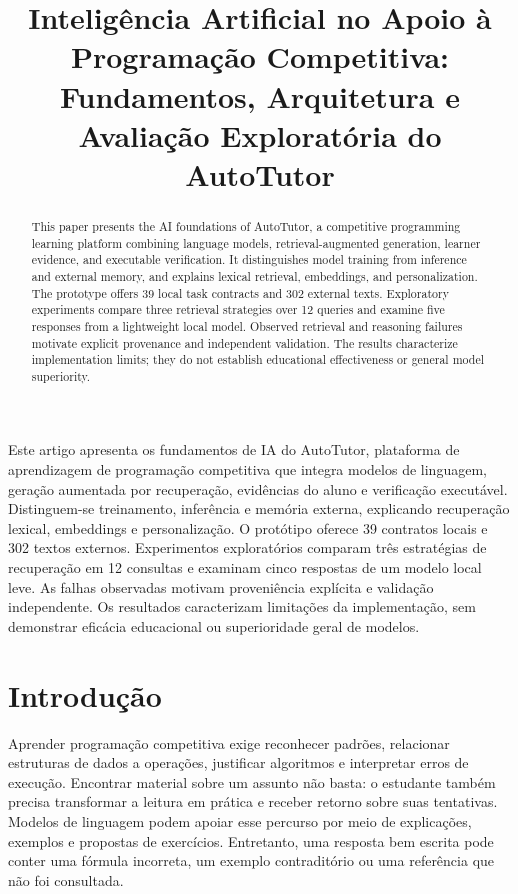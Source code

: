 \documentclass[12pt]{article}
\title{Inteligência Artificial no Apoio à Programação Competitiva:\\Fundamentos, Arquitetura e Avaliação Exploratória do AutoTutor}
\author{\AutoresArtigo}
\begin{document}
\maketitle
\begin{abstract}
This paper presents the AI foundations of AutoTutor, a competitive programming learning platform combining language models, retrieval-augmented generation, learner evidence, and executable verification. It distinguishes model training from inference and external memory, and explains lexical retrieval, embeddings, and personalization. The prototype offers 39 local task contracts and 302 external texts. Exploratory experiments compare three retrieval strategies over 12 queries and examine five responses from a lightweight local model. Observed retrieval and reasoning failures motivate explicit provenance and independent validation. The results characterize implementation limits; they do not establish educational effectiveness or general model superiority.
\end{abstract}
\begin{resumo}
Este artigo apresenta os fundamentos de IA do AutoTutor, plataforma de aprendizagem de programação competitiva que integra modelos de linguagem, geração aumentada por recuperação, evidências do aluno e verificação executável. Distinguem-se treinamento, inferência e memória externa, explicando recuperação lexical, embeddings e personalização. O protótipo oferece 39 contratos locais e 302 textos externos. Experimentos exploratórios comparam três estratégias de recuperação em 12 consultas e examinam cinco respostas de um modelo local leve. As falhas observadas motivam proveniência explícita e validação independente. Os resultados caracterizam limitações da implementação, sem demonstrar eficácia educacional ou superioridade geral de modelos.
\end{resumo}

\section{Introdução}
Aprender programação competitiva exige reconhecer padrões, relacionar estruturas de dados a operações, justificar algoritmos e interpretar erros de execução. Encontrar material sobre um assunto não basta: o estudante também precisa transformar a leitura em prática e receber retorno sobre suas tentativas. Modelos de linguagem podem apoiar esse percurso por meio de explicações, exemplos e propostas de exercícios. Entretanto, uma resposta bem escrita pode conter uma fórmula incorreta, um exemplo contraditório ou uma referência que não foi consultada.
\end{document}
